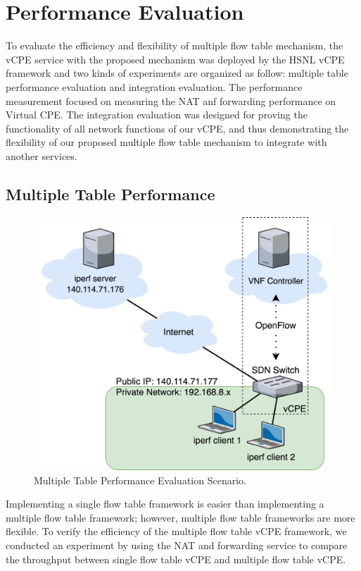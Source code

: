 \chapter{Performance Evaluation} \label{ch:evaluation}

To evaluate the efficiency and flexibility of multiple flow table mechanism, the vCPE service with the proposed mechanism was deployed by the HSNL vCPE framework and two kinds of experiments are organized as follow: multiple table performance evaluation and integration evaluation.
The performance measurement focused on measuring the NAT anf forwarding performance on Virtual CPE.
The integration evaluation was designed for proving the functionality of all network functions of our vCPE, and thus demonstrating the flexibility of our proposed multiple flow table mechanism to integrate with another services.

\section{Multiple Table Performance}

\begin{figure}[!t]
\centering
\includegraphics[width=\textwidth]{./fig/throughput_measurement_scenario.png}
\caption{Multiple Table Performance Evaluation Scenario.}
\label{fig:throughput_measurement_scenario}
\end{figure}

Implementing a single flow table framework is easier than implementing a multiple flow table framework; however, multiple flow table frameworks are more flexible.
To verify the efficiency of the multiple flow table vCPE framework, we conducted an experiment by using the NAT and forwarding service to compare the throughput between single flow table vCPE and multiple flow table vCPE.

